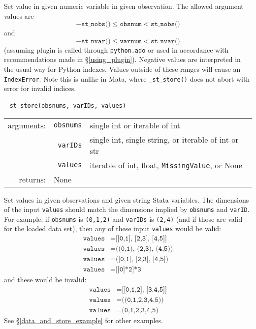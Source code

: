 \documentclass{article}
\begin{document}
			\vspace{1.5mm}
			\noindent Set value in given numeric variable in given observation. The allowed argument values are 
			\[
				-\texttt{st\_nobs()} \leq \texttt{obsnum} < \texttt{st\_nobs()}
			\]
			and
			\[
				-\texttt{st\_nvar()} \leq \texttt{varnum} < \texttt{st\_nvar()}
			\]
			(assuming plugin is called through \lstinline$python.ado$ or used in accordance with recommendations made in \S\ref{using_plugin}). Negative values are interpreted in the usual way for Python indexes. Values outside of these ranges will cause an \lstinline$IndexError$. Note this is unlike in Mata, where \lstinline{_st_store()} does not abort with error for invalid indices. \newline
			
			
			\ \newline
			\noindent \lstinline$st_store(obsnums, varIDs, values)$
								
			\vspace{1.5mm}
			\noindent 
			\indent \begin{tabular}{rrl}
					arguments: & \texttt{obsnums} & single int or iterable of int \\
						& \texttt{varIDs} & single int, single string, or iterable of int or str \\
						& \texttt{values} & iterable of int, float, \lstinline$MissingValue$, or None \\
					returns: & \multicolumn{2}{l}{None}
				\end{tabular}
								
			\vspace{1.5mm}
			\noindent Set values in given observations and given string Stata variables. The dimensions of the input \lstinline{values} should match the dimensions implied by \lstinline{obsnums} and \lstinline{varID}. For example, if \lstinline{obsnums} is \lstinline{(0,1,2)} and \lstinline{varIDs} is \lstinline{(2,4)} (and if those are valid for the loaded data set), then any of these input \lstinline{values} would be valid:
			\begin{align*}
				\texttt{values} &= \texttt{[[0,1], [2,3], [4,5]]} \\
				\texttt{values} &= \texttt{((0,1), (2,3), (4,5))} \\
				\texttt{values} &= \texttt{([0,1], [2,3], [4,5])} \\
				\texttt{values} &= \texttt{[[0]*2]*3}
			\end{align*}
			and these would be invalid:
			\begin{align*}
				\texttt{values} &= \texttt{[[0,1,2], [3,4,5]]} \\
				\texttt{values} &= \texttt{((0,1,2,3,4,5))} \\
				\texttt{values} &= \texttt{(0,1,2,3,4,5)}
			\end{align*}
See \S\ref{data_and_store_example} for other examples. 
			
\end{document}
